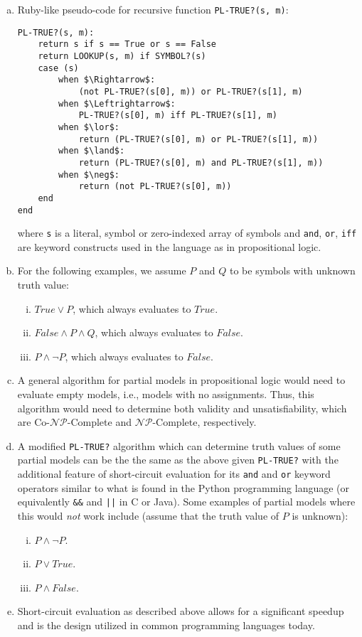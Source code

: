 \documentclass{scrartcl}
\begin{document}
\begin{enumerate}[(a)]
    \item Ruby-like pseudo-code for recursive function \verb|PL-TRUE?(s, m)|:
\begin{lstlisting}
PL-TRUE?(s, m):
    return s if s == True or s == False
    return LOOKUP(s, m) if SYMBOL?(s)
    case (s)
        when $\Rightarrow$:
            (not PL-TRUE?(s[0], m)) or PL-TRUE?(s[1], m)
        when $\Leftrightarrow$:
            PL-TRUE?(s[0], m) iff PL-TRUE?(s[1], m)
        when $\lor$:
            return (PL-TRUE?(s[0], m) or PL-TRUE?(s[1], m))
        when $\land$:
            return (PL-TRUE?(s[0], m) and PL-TRUE?(s[1], m))
        when $\neg$:
            return (not PL-TRUE?(s[0], m))
    end
end
\end{lstlisting}
        where \verb|s| is a literal, symbol or zero-indexed array of symbols and \verb|and|,
        \verb|or|, \verb|iff| are keyword constructs used in the language as in propositional logic.
    \item For the following examples, we assume $P$ and $Q$ to be symbols with unknown truth value:
        \begin{enumerate}[(i)]
            \item $True \lor P$, which always evaluates to $True$.
            \item $False \land P \land Q$, which always evaluates to $False$.
            \item $P \land \neg P$, which always evaluates to $False$.
        \end{enumerate}
    \item A general algorithm for partial models in propositional logic would need to evaluate empty
        models, i.e., models with no assignments. Thus, this algorithm would need to determine both
        validity and unsatisfiability, which are Co-$\mathcal{NP}$-Complete and
        $\mathcal{NP}$-Complete, respectively.
    \item A modified \verb|PL-TRUE?| algorithm which can determine truth values of some partial
        models can be the the same as the above given \verb|PL-TRUE?| with the additional feature of
        short-circuit evaluation for its \verb|and| and \verb|or| keyword operators similar to what
        is found in the Python programming language (or equivalently \verb|&&| and \verb:||: in
        C or Java). Some examples of partial models where this would \emph{not} work include (assume
        that the truth value of $P$ is unknown):
        \begin{enumerate}[(i)]
            \item $P \land \neg P$.
            \item $P \lor True$.
            \item $P \land False$.
        \end{enumerate}
    \item Short-circuit evaluation as described above allows for a significant speedup and is the
        design utilized in common programming languages today.
\end{enumerate}
\end{document}
